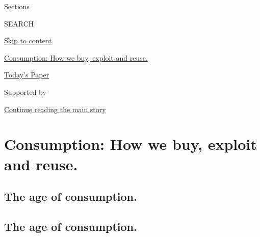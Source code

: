 Sections

SEARCH

\protect\hyperlink{site-content}{Skip to content}

\href{https://www.nytimes3xbfgragh.onion/issue/fashion/2019/12/16/consumption}{Consumption:
How we buy, exploit and reuse.}

\href{https://myaccount.nytimes3xbfgragh.onion/auth/login?response_type=cookie\&client_id=vi}{}

\href{https://www.nytimes3xbfgragh.onion/section/todayspaper}{Today's
Paper}

Supported by

\protect\hyperlink{after-sponsor}{Continue reading the main story}

\hypertarget{consumption-how-we-buy-exploit-and-reuse}{%
\section{Consumption: How we buy, exploit and
reuse.}\label{consumption-how-we-buy-exploit-and-reuse}}

\hypertarget{the-age-of-consumption}{%
\subsection{The age of consumption.}\label{the-age-of-consumption}}

\hypertarget{the-age-of-consumption-1}{%
\subsection{The age of consumption.}\label{the-age-of-consumption-1}}

